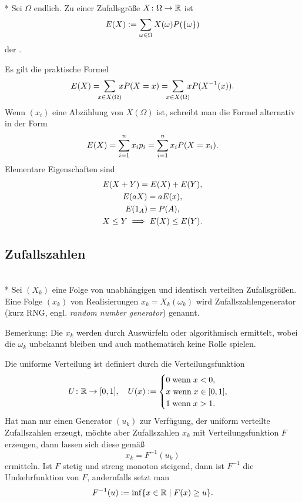 \begin{definition}[Erwartungswert]\mbox{}\\*
Sei $\Omega$ endlich. Zu einer Zufallsgröße
$X\colon\Omega\to\mathbb R$ ist%
\begin{equation}
E(X) := \sum_{\omega\in\Omega} X(\omega)P(\{\omega\})
\end{equation}
der .
\end{definition}
Es gilt die praktische Formel
\begin{equation}
\E(X) = \!\!\!\sum_{x\in X(\Omega)}\!\!\! xP(X=x)
= \!\!\!\sum_{x\in X(\Omega)}\!\!\! xP(X^{-1}(x)).
\end{equation}
Wenn $(x_i)$ eine Abzählung von $X(\Omega)$ ist, schreibt man
die Formel alternativ in der Form
\begin{equation}
E(X) = \sum_{i=1}^n x_i p_i = \sum_{i=1}^n x_i P(X=x_i).
\end{equation}
Elementare Eigenschaften sind
\begin{gather}
E(X+Y) = E(X)+E(Y),\\
E(aX) = aE(x),\\
E(1_A) = P(A),\\
X\le Y \implies E(X) \le E(Y).
\end{gather}

\subsection{Zufallszahlen}

\begin{definition}[Zufallszahlengenerator]\mbox{}\\*
Sei $(X_k)$ eine Folge von unabhängigen und
identisch verteilten Zufallsgrößen. Eine Folge
$(x_k)$ von Realisierungen $x_k=X_k(\omega_k)$ wird
Zufallszahlengenerator (kurz RNG, engl. \emph{random number generator})
genannt.
\end{definition}

\noindent
Bemerkung: Die $x_k$ werden durch Auswürfeln oder algorithmisch
ermittelt, wobei die $\omega_k$ unbekannt bleiben und auch
mathematisch keine Rolle spielen.

\minisection{}
Die uniforme Verteilung ist definiert durch die Verteilungsfunktion
\begin{equation}
U\colon\mathbb R\to [0,1],\quad U(x):=\begin{cases}
0\;\text{wenn}\;x<0,\\
x\;\text{wenn}\;x\in [0,1],\\
1\;\text{wenn}\;x>1.
\end{cases}
\end{equation}
Hat man nur einen Generator $(u_k)$ zur Verfügung, der uniform
verteilte Zufallszahlen erzeugt, möchte aber Zufallszahlen $x_k$
mit Verteilungsfunktion $F$ erzeugen, dann lassen sich diese
gemäß
\begin{equation}
x_k = F^{-1}(u_k)
\end{equation}
ermitteln. Ist $F$ stetig und streng monoton steigend, dann
ist $F^{-1}$ die Umkehrfunktion von $F$, andernfalls setzt man
\begin{equation}
F^{-1}(u) := \inf\{x\in\mathbb R\mid F(x)\ge u\}.
\end{equation}

